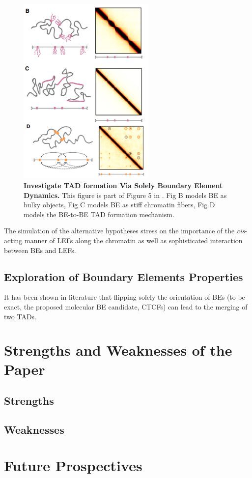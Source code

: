 \documentclass[11pt]{article}
\begin{document}
\begin{figure}[htbp]
  \centering
  \includegraphics[width=0.6\textwidth]{assets/Snipaste_2023-01-13_18-53-59.png}
  \caption{\textbf{Investigate TAD formation Via Solely Boundary Element Dynamics.} This figure is part of Figure 5 in \cite{fudenberg_formation_2016}. Fig B models BE as bulky objects, Fig C models BE as stiff chromatin fibers, Fig D models the BE-to-BE TAD formation mechanism.}
  \label{fig:Investigate TAD formation Via Solely Boundary Element Dynamics}
\end{figure}

The simulation of the alternative hypotheses stress on the importance of the \textit{cis}-acting manner of LEFs along the chromatin as well as sophisticated interaction between BEs and LEFs.

\subsection{Exploration of Boundary Elements Properties}

It has been shown in literature that flipping solely the orientation of BEs (to be exact, the proposed molecular BE candidate, CTCFs) can lead to the merging of two TADs.



\section{Strengths and Weaknesses of the Paper}

\subsection*{Strengths}


\subsection*{Weaknesses}


\section{Future Prospectives}

\printbibliography
\end{document}
